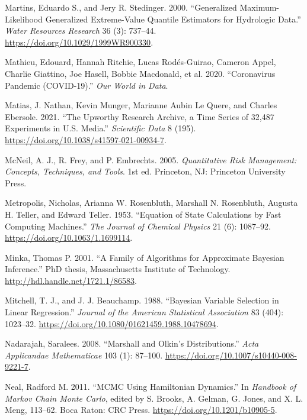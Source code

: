 \documentclass[
  11pt,
  letterpaper,
]{scrbook}
\newlength{\cslhangindent}
\newenvironment{CSLReferences}[2] %
 {\begin{list}{}{%
  \setlength{\itemindent}{0pt}
  \setlength{\leftmargin}{0pt}
  \setlength{\parsep}{0pt}
  \ifodd #1
   \setlength{\leftmargin}{\cslhangindent}
   \setlength{\itemindent}{-1\cslhangindent}
  \fi
  \setlength{\itemsep}{#2\baselineskip}}}
 {\end{list}}
\theoremstyle{plain}
\theoremstyle{plain}
\theoremstyle{definition}
\theoremstyle{definition}
\theoremstyle{definition}
\theoremstyle{plain}
\theoremstyle{remark}
\begin{document}
\begin{CSLReferences}{1}{0}
Martins, Eduardo S., and Jery R. Stedinger. 2000. {``Generalized
Maximum-Likelihood Generalized Extreme-Value Quantile Estimators for
Hydrologic Data.''} \emph{Water Resources Research} 36 (3): 737--44.
\url{https://doi.org/10.1029/1999WR900330}.

Mathieu, Edouard, Hannah Ritchie, Lucas Rodés-Guirao, Cameron Appel,
Charlie Giattino, Joe Hasell, Bobbie Macdonald, et al. 2020.
{``Coronavirus Pandemic (COVID-19).''} \emph{Our World in Data}.

Matias, J. Nathan, Kevin Munger, Marianne Aubin Le Quere, and Charles
Ebersole. 2021. {``The {U}pworthy {R}esearch {A}rchive, a Time Series of
32,487 Experiments in {U.S.} Media.''} \emph{Scientific Data} 8 (195).
\url{https://doi.org/10.1038/s41597-021-00934-7}.

McNeil, A. J., R. Frey, and P. Embrechts. 2005. \emph{Quantitative Risk
Management: Concepts, Techniques, and Tools}. 1st ed. Princeton, NJ:
Princeton University Press.

Metropolis, Nicholas, Arianna W. Rosenbluth, Marshall N. Rosenbluth,
Augusta H. Teller, and Edward Teller. 1953. {``Equation of State
Calculations by Fast Computing Machines.''} \emph{The Journal of
Chemical Physics} 21 (6): 1087--92.
\url{https://doi.org/10.1063/1.1699114}.

Minka, Thomas P. 2001. {``A Family of Algorithms for Approximate
{B}ayesian Inference.''} PhD thesis, Massachusetts Institute of
Technology. \url{http://hdl.handle.net/1721.1/86583}.

Mitchell, T. J., and J. J. Beauchamp. 1988. {``Bayesian Variable
Selection in Linear Regression.''} \emph{Journal of the American
Statistical Association} 83 (404): 1023--32.
\url{https://doi.org/10.1080/01621459.1988.10478694}.

Nadarajah, Saralees. 2008. {``{M}arshall and {O}lkin's Distributions.''}
\emph{Acta Applicandae Mathematicae} 103 (1): 87--100.
\url{https://doi.org/10.1007/s10440-008-9221-7}.

Neal, Radford M. 2011. {``{MCMC} Using {H}amiltonian Dynamics.''} In
\emph{Handbook of {M}arkov Chain {M}onte {C}arlo}, edited by S. Brooks,
A. Gelman, G. Jones, and X. L. Meng, 113--62. Boca Raton: CRC Press.
\url{https://doi.org/10.1201/b10905-5}.


\end{CSLReferences}
\end{document}

